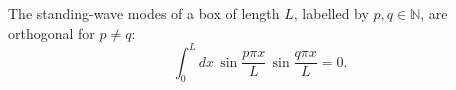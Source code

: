\documentclass{article}
\begin{document}
The standing-wave modes of a box of length $L$, labelled by $p, q \in \mathbb{N}$, are orthogonal for $p \neq q$:
\begin{equation}
\int_0^{L} dx\, \sin\frac{p\pi x}{L}\,\sin\frac{q\pi x}{L} = 0 .
\label{eq:box}
\end{equation}
\end{document}
